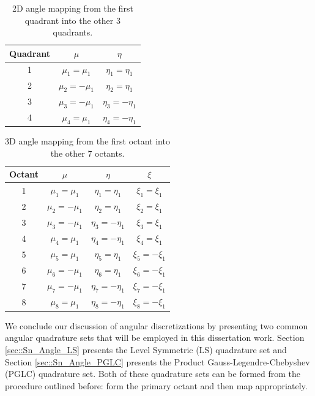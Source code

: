\begin{table}[hbt]
\centering
\caption{2D angle mapping from the first quadrant into the other 3 quadrants.}
\begin{tabular}{|c|cc|}
	\hline
	Quadrant & $\mu$ & $\eta$ \\
	\hline
	1 & $\mu_1=\mu_1$ & $\eta_1=\eta_1$ \\
	\hline
	2 & $\mu_2=-\mu_1$ & $\eta_2=\eta_1$ \\
	\hline
	3 & $\mu_3=-\mu_1$ & $\eta_3=-\eta_1$ \\
	\hline
	4 & $\mu_4=\mu_1$ & $\eta_4=-\eta_1$ \\
	\hline
\end{tabular}
\label{tab::Sn_2D_octant_mapping}
\end{table}

\begin{table}[hbt]
\centering
\caption{3D angle mapping from the first octant into the other 7 octants.}
\begin{tabular}{|c|ccc|}
	\hline
	Octant & $\mu$ & $\eta$ & $\xi $ \\
	\hline
	1 & $\mu_1=\mu_1$ & $\eta_1=\eta_1$ & $\xi_1=\xi_1$ \\
	\hline
	2 & $\mu_2=-\mu_1$ & $\eta_2=\eta_1$ & $\xi_2=\xi_1$ \\
	\hline
	3 & $\mu_3=-\mu_1$ & $\eta_3=-\eta_1$ & $\xi_3=\xi_1$ \\
	\hline
	4 & $\mu_4=\mu_1$ & $\eta_4=-\eta_1$ & $\xi_4=\xi_1$ \\
	\hline
	5 & $\mu_5=\mu_1$ & $\eta_5=\eta_1$ & $\xi_5=-\xi_1$ \\
	\hline
	6 & $\mu_6=-\mu_1$ & $\eta_6=\eta_1$ & $\xi_6=-\xi_1$ \\
	\hline
	7 & $\mu_7=-\mu_1$ & $\eta_7=-\eta_1$ & $\xi_7=-\xi_1$ \\
	\hline
	8 & $\mu_8=\mu_1$ & $\eta_8=-\eta_1$ & $\xi_8=-\xi_1$ \\
	\hline
\end{tabular}
\label{tab::Sn_3D_octant_mapping}
\end{table}

We conclude our discussion of angular discretizations by presenting two common angular quadrature sets that will be employed in this dissertation work. Section \ref{sec::Sn_Angle_LS} presents the Level Symmetric (LS) quadrature set and Section \ref{sec::Sn_Angle_PGLC} presents the Product Gauss-Legendre-Chebyshev (PGLC) quadrature set. Both of these quadrature sets can be formed from the procedure outlined before: form the primary octant and then map appropriately.

